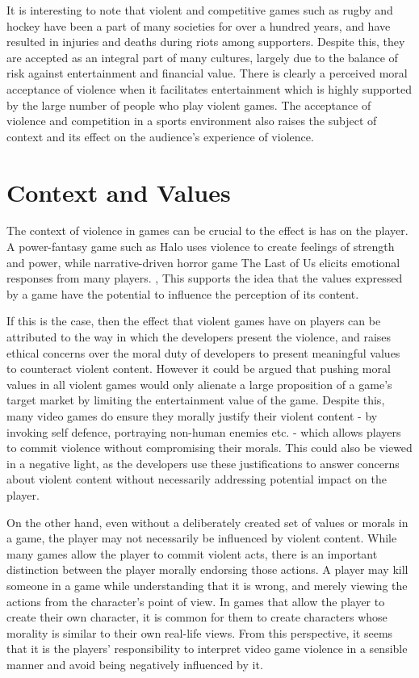 \documentclass{scrartcl}
\begin{document}
		It is interesting to note that violent and competitive games such as rugby and hockey have been a part of many societies for over a hundred years, and have resulted in injuries and deaths during riots among supporters. \cite{marketOfViolence} Despite this, they are accepted as an integral part of many cultures, largely due to the balance of risk against entertainment and financial value. \cite{wrongToPlayGames} There is clearly a perceived moral acceptance of violence when it facilitates entertainment which is highly supported by the large number of people who play violent games. The acceptance of violence and competition in a sports environment also raises the subject of context and its effect on the audience's experience of violence. 
		
	\section{Context and Values}
		The context of violence in games can be crucial to the effect is has on the player. A power-fantasy game such as Halo uses violence to create feelings of strength and power, while narrative-driven horror game The Last of Us elicits emotional responses from many players. \cite{lastOfUsEmotional}, \cite{lastOfUsGreatestGame} This supports the idea that the values expressed by a game have the potential to influence the perception of its content. \cite{ValueViolence} \cite{DefendMorality}
		
		If this is the case, then the effect that violent games have on players can be attributed to the way in which the developers present the violence, and raises ethical concerns over the moral duty of developers to present meaningful values to counteract violent content. However it could be argued that pushing moral values in all violent games would only alienate a large proposition of a game's target market by limiting the entertainment value of the game. \cite{marketOfViolence} Despite this, many video games do ensure they morally justify their violent content - by invoking self defence, portraying non-human enemies etc. - which allows players to commit violence without compromising their morals. \cite{violentCommunication} This could also be viewed in a negative light, as the developers use these justifications to answer concerns about violent content without necessarily addressing potential impact on the player. 
		
		On the other hand, even without a deliberately created set of values or morals in a game, the player may not necessarily be influenced by violent content. While many games allow the player to commit violent acts, there is an important distinction between the player morally endorsing those actions. A player may kill someone in a game while understanding that it is wrong, and merely viewing the actions from the character's point of view. \cite{FreeWill} In games that allow the player to create their own character, it is common for them to create characters whose morality is similar to their own real-life views. \cite{BadCharacter} From this perspective, it seems that it is the players' responsibility to interpret video game violence in a sensible manner and avoid being negatively influenced by it. 
	
\end{document}
